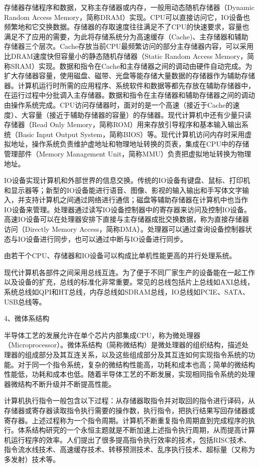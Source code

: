 \documentclass[]{ctexbook}
\begin{document}
存储器存储程序和数据，又称主存储器或内存，一般用动态随机存储器（Dynamic Random Access Memory，简称DRAM）实现。CPU可以直接访问它，IO设备也频繁地和它交换数据。存储器的存取速度往往满足不了CPU的快速要求，容量也满足不了应用的需要，为此将存储系统分为高速缓存（Cache)、主存储器和辅助存储器三个层次。Cache存放当前CPU最频繁访问的部分主存储器内容，可以采用比DRAM速度快但容量小的静态随机存储器（Static Random Access Memory，简称SRAM）实现。数据和指令在Cache和主存储器之间的调动由硬件自动完成。为扩大存储器容量，使用磁盘、磁带、光盘等能存储大量数据的存储器作为辅助存储器。计算机运行时所需的应用程序、系统软件和数据等都先存放在辅助存储器中，在运行过程中分批调入主存储器。数据和指令在主存储器和辅助存储器之间的调动由操作系统完成。CPU访问存储器时，面对的是一个高速（接近于Cache的速度）、大容量（接近于辅助存储器的容量）的存储器。现代计算机中还有少量只读存储器（Read Only Memory，简称ROM）用来存放引导程序和基本输入输出系统（Basic Input Output System，简称BIOS）等。现代计算机访问内存时采用虚拟地址，操作系统负责维护虚地址和物理地址转换的页表，集成在CPU中的存储管理部件（Memory Management Unit，简称MMU）负责把虚拟地址转换为物理地址。

IO设备实现计算机和外部世界的信息交换。传统的IO设备有键盘、鼠标、打印机和显示器等；新型的IO设备能进行语音、图像、影视的输入输出和手写体文字输入，并支持计算机之间通过网络进行通信；磁盘等辅助存储器在计算机中也当作IO设备来管理。处理器通过读写IO设备控制器中的寄存器来访问及控制IO设备。高速IO设备可以在处理器安排下直接与主存储器成批交换数据，称为直接存储器访问（Directly Memory Access，简称DMA）。处理器可以通过查询设备控制器状态与IO设备进行同步，也可以通过中断与IO设备进行同步。

由若干个CPU、存储器和IO设备可以构成比单机性能更高的并行处理系统。

现代计算机各部件之间采用总线互连。为了便于不同厂家生产的设备能在一起工作以及设备的扩充，总线的标准化非常重要。常见的总线包括片上总线如AXI总线，系统总线如QPI和HT总线，内存总线如SDRAM总线，IO总线如PCIE、SATA、USB总线等。

4、微体系结构

半导体工艺的发展允许在单个芯片内部集成CPU，称为微处理器（Microprocessor）。微体系结构（简称微结构）是微处理器的组织结构，描述处理器的组成部分及其互连关系，以及这些组成部分及其互连如何实现指令系统的功能。对于同一个指令系统，复杂的微结构性能高，功耗和成本也高；简单的微结构性能低，功耗和成本也低。随着半导体工艺的不断发展，实现相同指令系统的处理器微结构不断升级并不断提高性能。

计算机执行指令一般包含以下过程：从存储器取指令并对取回的指令进行译码，从存储器或寄存器读取指令执行需要的操作数，执行指令，把执行结果写回存储器或寄存器。上述过程称为一个指令周期。计算机不断重复指令周期直到完成程序的执行。体系结构研究的一个永恒主题就是不断加速上述指令执行周期，从而提高计算机运行程序的效率。人们提出了很多提高指令执行效率的技术，包括RISC技术、指令流水线技术、高速缓存技术、转移预测技术、乱序执行技术、超标量（又称为多发射）技术等。
\end{document}
